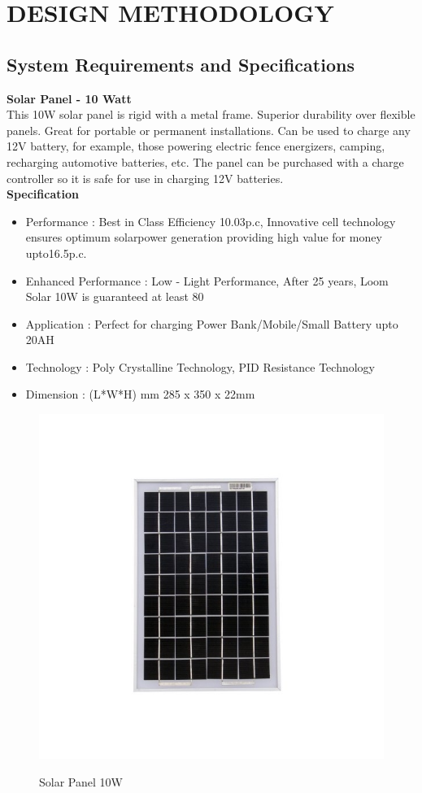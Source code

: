 \documentclass[a4paper,12pt]{article}
\begin{document}
\section{DESIGN METHODOLOGY}
\subsection{System Requirements and Specifications}

\textbf{Solar Panel - 10 Watt}\\[1cm]
This 10W solar panel is rigid with a metal frame. Superior durability over flexible panels. Great for portable or permanent installations. Can be used to charge any 12V battery, for example, those powering electric fence energizers, camping, recharging automotive batteries, etc. The panel can be purchased with a charge controller so it is safe for use in charging 12V batteries.\\
\textbf{Specification}
\begin{itemize}
\item Performance : Best in Class Efficiency {10.03p.c}, Innovative cell technology ensures optimum solarpower generation providing high value for money upto16.5p.c.
\item Enhanced Performance : Low - Light Performance, After 25 years, Loom Solar 10W is guaranteed at least 80%
\item Application : Perfect for charging Power Bank/Mobile/Small Battery upto 20AH
\item Technology : Poly Crystalline Technology, PID Resistance Technology
\item Dimension : (L*W*H) mm 285 x 350 x 22mm

\end{itemize}
\begin{figure}[!h]
\centering
\includegraphics[scale=0.4]{sp.jpg}\\
\caption{Solar Panel 10W}
\end{figure}
\end{document}
